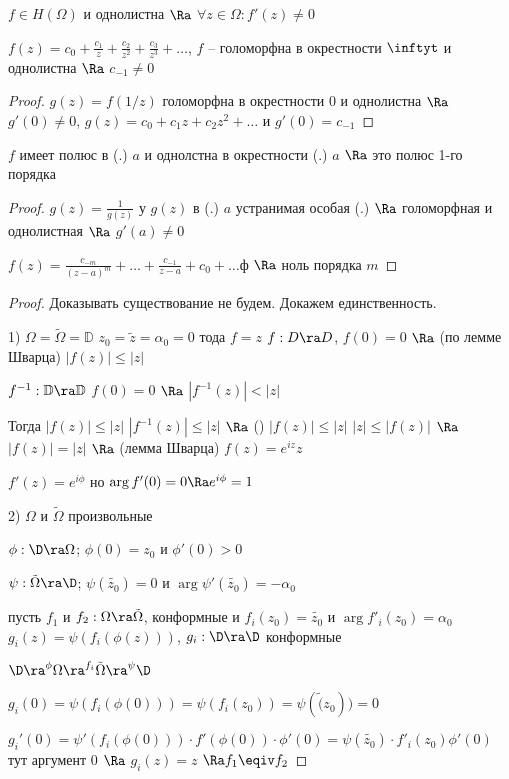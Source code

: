 \begin{theorem}
	$f \in H(\Omega)$ и однолистна $\Ra$ $\forall z \in \Omega\colon f'(z) \neq 0$
\end{theorem}

\begin{conseq}
	$f(z) = c_0 + \frac{c_1}{z} + \frac{c_2}{z^2} + \frac{c_3}{z^3} + \ldots$, 
	$f$ -- голоморфна в окрестности $\inftyt$ и однолистна 
	$\Ra$ 
	$c_{-1} \neq 0$
\end{conseq}

\begin{proof}
	$g(z) = f(1 / z)$ голоморфна в окрестности 0 и однолистна
	$\Ra$ 
	$g'(0) \neq 0$, $g(z) = c_0 + c_1 z + c_2 z^2 + \ldots$ и
	$g'(0) = c_{-1}$
\end{proof}

\begin{conseq}
	$f$ имеет полюс в (.) $a$ и однолстна в окрестности (.) $a$
	$\Ra$ 
	это полюс 1-го порядка
\end{conseq}

\begin{proof}
	$g(z) = \frac{1}{g(z)}$ у $g(z)$ в (.) $a$ устранимая особая (.) 
	$\Ra$
	голоморфная и однолистная 
	$\Ra$ 
	$g'(a) \neq 0$

	$f(z) = \frac{c_{-m}}{(z-a)^m} + \ldots + \frac{c_{-1}}{z - a} +  c_0 + \ldots$ф
	$\Ra$
	ноль порядка $m$
\end{proof}


\begin{proof}
Доказывать существование не будем.
Докажем единственность.

1) $\Omega = \tilde{\Omega} = \mathbb{D}$ $z_0 = \tilde{z} = \alpha_0 = 0$
	тода $f = z$
	$f: D \ra D$, $f(0) = 0$ 
	$\Ra$ (по лемме Шварца)
	$|f(z)| \leq |z|$

	$f^{-1}: \mathbb{D} \ra \mathbb{D}$
	$f(0) = 0$
	$\Ra$
	$|f^{-1}(z)| < |z|$

	Тогда 
	$|f(z)| \leq |z|$
	$|f^{-1}(z)| \leq |z|$
	$\Ra$ ()
	$|f(z)| \leq |z|$
	$|z| \leq |f(z)|$
	$\Ra$
	$|f(z)| = |z|$
	$\Ra$ (лемма Шварца)
	$f(z) = e^{iz}z$

	$f'(z) = e^{i\phi}$ но $\arg f'(0) = 0 \Ra e^{i\phi} = 1$

2) $\Omega$ и $\tilde{\Omega}$ произвольные

	$\phi: \D \ra \Omega$; $\phi(0) = z_0$ и $\phi'(0) > 0$

	$\psi: \tilde{\Omega} \ra \D$; $\psi(\tilde{z_0}) = 0$ и $\arg \psi'(\tilde{z_0}) = -\alpha_0$

	пусть $f_1$ и $f_2: \Omega \ra \tilde{\Omega}$,  конформные и $f_i(z_0) = \tilde{z_0}$ и $\arg f'_i(z_0) = \alpha_0$
	$g_i(z) = \psi(f_i(\phi(z)))$, $g_i: \D \ra \D$ конформные

	$\D \ra^\phi \Omega \ra^{f_i} \tilde{\Omega} \ra^{\psi} \D$

	$g_i(0) = \psi(f_i(\phi(0))) = \psi(f_i(z_0)) = \psi(\tilde(z_0)) = 0$

	$g_i'(0) = \psi'(f_i(\phi(0))) \cdot f'(\phi(0)) \cdot \phi'(0) = \psi(\tilde{z_0}) \cdot f'_i(z_0) \phi'(0)$ тут аргумент 0 
	$\Ra$ 
	$g_i(z) = z$
	$\Ra f_1 \eqiv f_2$
\end{proof}


